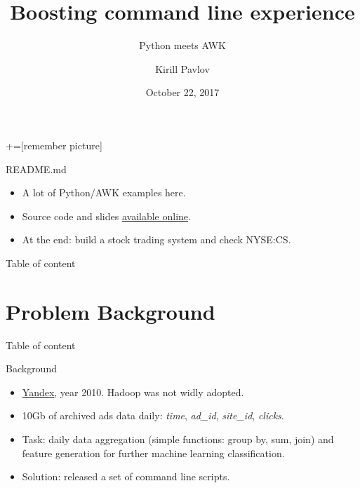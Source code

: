 \documentclass[unicode, notheorems, aspectratio=169]{beamer}
\title[Boosting command line: python + awk]{Boosting command line experience}
\subtitle{Python meets AWK}
\author[Kirill Pavlov <k@p99.io>]{Kirill Pavlov}
\institute[]{Technical Recruiter, Terminal 1}
\date{October 22, 2017}
\begin{document}
+=[remember picture]

\everymath{\displaystyle}


\begin{frame}
\titlepage
\end{frame}

\begin{frame}{README.md}
\begin{itemize}
\item A lot of Python/AWK examples here.
\item Source code and slides \href{https://github.com/pavlov99/presentations/tree/master/2017-10-22-codeconf}{available online}.
\item At the end: build a stock trading system and check NYSE:CS.
\end{itemize}
\end{frame}

\begin{frame}{Table of content}
    \tableofcontents
\end{frame}

\section{Problem Background}
\begin{frame}{Table of content}
	\tableofcontents[currentsection]
\end{frame}

\begin{frame}{Background}
\begin{itemize}
\item \href{https://yandex.com}{Yandex}, year 2010. Hadoop was not widly adopted.
\item 10Gb of archived ads data daily: \textit{time}, \textit{ad\_id}, \textit{site\_id}, \textit{clicks}.
\item Task: daily data aggregation (simple functions: group by, sum, join) and feature generation for further machine learning classification.
\item Solution: released a set of command line scripts.
\end{itemize}
\end{frame}
\end{document}
